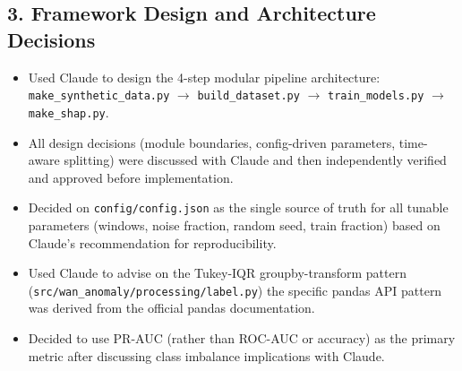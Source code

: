 \documentclass{article}
\begin{document}
\subsection*{3. Framework Design and Architecture Decisions}
\begin{itemize}
  \item Used Claude to design the 4-step modular pipeline architecture:\\
        \texttt{make\_synthetic\_data.py} $\to$ \texttt{build\_dataset.py}
        $\to$ \texttt{train\_models.py} $\to$ \texttt{make\_shap.py}.
  \item All design decisions (module boundaries, config-driven parameters,
        time-aware splitting) were discussed with Claude and then independently
        verified and approved before implementation.
  \item Decided on \texttt{config/config.json} as the single source of truth for
        all tunable parameters (windows, noise fraction, random seed, train
        fraction) based on Claude's recommendation for reproducibility.
  \item Used Claude to advise on the Tukey-IQR groupby-transform pattern\\
        (\texttt{src/wan\_anomaly/processing/label.py}) the specific pandas API
        pattern was derived from the official pandas documentation.
  \item Decided to use PR-AUC (rather than ROC-AUC or accuracy) as the primary
        metric after discussing class imbalance implications with Claude.
\end{itemize}

\end{document}

